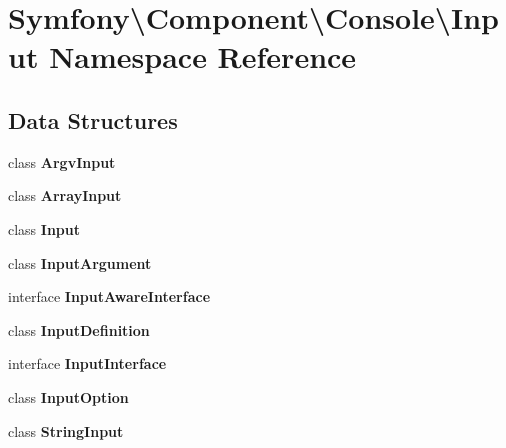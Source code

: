 \section{Symfony\textbackslash{}Component\textbackslash{}Console\textbackslash{}Input Namespace Reference}
\label{namespace_symfony_1_1_component_1_1_console_1_1_input}
\subsection*{Data Structures}
\begin{DoxyCompactItemize}
\item 
class {\bf Argv\+Input}
\item 
class {\bf Array\+Input}
\item 
class {\bf Input}
\item 
class {\bf Input\+Argument}
\item 
interface {\bf Input\+Aware\+Interface}
\item 
class {\bf Input\+Definition}
\item 
interface {\bf Input\+Interface}
\item 
class {\bf Input\+Option}
\item 
class {\bf String\+Input}
\end{DoxyCompactItemize}
